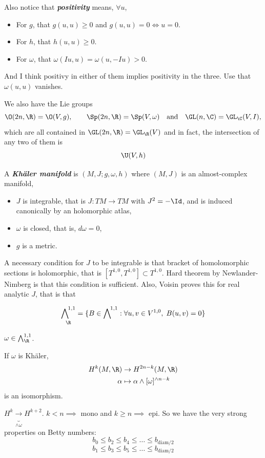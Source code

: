 Also notice that \textbf{\textit{positivity}} means, $\forall u$,
\begin{itemize}
	\item For $g$, that $g(u,u)\geq0$ and $g(u,u)=0\iff u=0$.
	\item For $h$, that $h(u,u)\geq0$.
	\item For $\omega$, that $\omega(Iu,u)=\omega(u,-Iu)>0$.
\end{itemize}
And I think positivy in either of them implies positivity in the three. Use that $\omega(u,u)$ vanishes.

We also have the Lie groups
\[\O(2n,\R)=\O(V,g),\qquad\Sp(2n,\R)=\Sp(V,\omega)\quad\text{and}\quad\GL(n,\C)=\GL_\C(V,I),\]
which are all contained in $\GL(2n,\R)=\GL_\R(V)$ and in fact, the intersection of any two of them is
\[\U(V,h)\]
\begin{defn}
	A \textbf{\textit{Khäler manifold}} is $(M,J;g,\omega,h)$ where $(M,J)$ is an almost-complex manifold,
	\begin{itemize}
		\item $J$ is integrable, that is $J:TM\to TM$ with $J^2=-\Id$, and is induced canonically by an holomorphic atlas,
		\item $\omega$ is closed, that is, $d\omega=0$,
		\item $g$ is a metric.
	\end{itemize}
\end{defn}
\begin{thm}
	A necessary condition for $J$ to be integrable is that bracket of homolomorphic sections is holomorphic, that is $[T^{1,0},T^{1,0}]\subset T^{1,0}$. Hard theorem by Newlander-Nimberg is that this condition is sufficient. Also, Voisin proves this for real analytic $J$, that is that
\end{thm}
\begin{defn}
	\[\extp^{1,1}_\R=\{B\in\extp^{1,1}:\forall u,v\in V^{1,0},\;B(u,v)=0\}\]
\end{defn}
\begin{claim}
	$\omega\in\bigwedge^{1,1}_\R$.
\end{claim}
\begin{thm}
	If $\omega$ is Khäler,
	\begin{align*}
		H^k(M,\R)&\to H^{2n-k}(M,\R)\\
		\alpha&\mapsto \alpha\wedge[\omega]^{\wedge n-k}
	\end{align*}
	is an isomorphism.
\end{thm}
\begin{coro}
	$H^k\underbrace{\to}_{\wedge\omega} H^{k+2}$. $k<n\implies$ mono and $k\geq n\implies$ epi. So we have the very strong properties on Betty numbers:
	\[b_0\leq b_2\leq b_4\leq \ldots\leq b_{\text{diam}/2}\]
	\[b_1\leq b_3\leq b_5\leq\ldots\leq b_{\text{diam}/2}\]
\end{coro}

